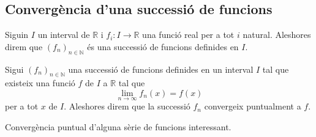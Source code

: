 \documentclass[../Apunts.tex]{subfiles}
\begin{document}
	\subsection{Convergència d'una successió de funcions}
	\begin{definition}
		\label{def:successió de funcions}
		Siguin \(I\) un interval de \(\mathbb{R}\) i \(f_{i}\colon I\longrightarrow\mathbb{R}\) una funció real per a tot \(i\) natural. Aleshores direm que \((f_{n})_{n\in\mathbb{N}}\) és una successió de funcions definides en \(I\).
	\end{definition}
	\begin{definition}
		\label{def:convergència puntual}
		Sigui \((f_{n})_{n\in\mathbb{N}}\) una successió de funcions definides en un interval \(I\) tal que existeix una funció \(f\) de \(I\) a \(\mathbb{R}\) tal que
		\[\lim_{n\to\infty}f_{n}(x)=f(x)\]
		per a tot \(x\) de \(I\). Aleshores direm que la successió \(f_{n}\) convergeix puntualment a \(f\).
	\end{definition}
	\begin{example}
		Convergència puntual d'alguna sèrie de funcions interessant.
	\end{example}
\end{document}
